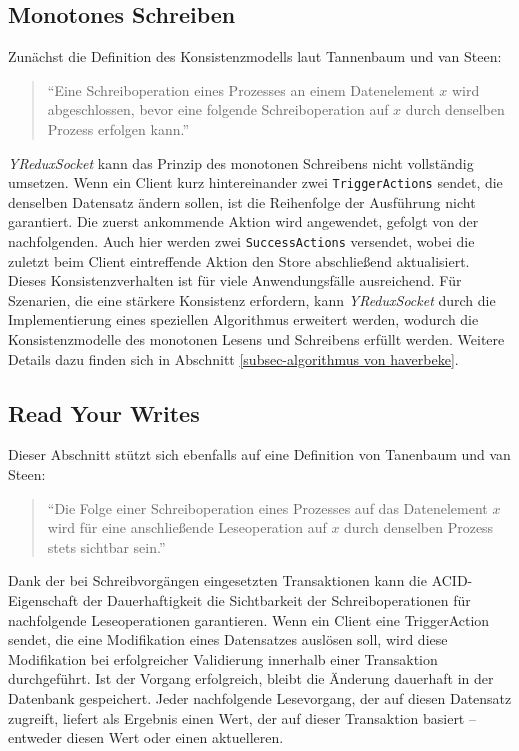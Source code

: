 \documentclass[12pt]{book}          %
\begin{document}
\subsection{Monotones Schreiben}
\label{subsec-monotones-schreiben}

Zunächst die Definition des Konsistenzmodells laut Tannenbaum und van Steen:

\begin{quote}
"`Eine Schreiboperation eines Prozesses an einem Datenelement $x$ wird abgeschlossen, bevor eine folgende Schreiboperation auf $x$ durch denselben Prozess erfolgen kann."' \cite[323]{tanenbaum_verteilte_2008}
\end{quote}

\textit{YReduxSocket} kann das Prinzip des monotonen Schreibens nicht vollständig umsetzen. Wenn ein Client kurz hintereinander zwei \texttt{TriggerActions} sendet, die denselben Datensatz ändern sollen, ist die Reihenfolge der Ausführung nicht garantiert. Die zuerst ankommende Aktion wird angewendet, gefolgt von der nachfolgenden. Auch hier werden zwei \texttt{SuccessActions} versendet, wobei die zuletzt beim Client eintreffende Aktion den Store abschließend aktualisiert. Dieses Konsistenzverhalten ist für viele Anwendungsfälle ausreichend. Für Szenarien, die eine stärkere Konsistenz erfordern, kann \textit{YReduxSocket} durch die Implementierung eines speziellen Algorithmus erweitert werden, wodurch die Konsistenzmodelle des monotonen Lesens und Schreibens erfüllt werden. Weitere Details dazu finden sich in Abschnitt \ref{subsec-algorithmus von haverbeke}.

\subsection{Read Your Writes}
\label{subsec-read-your-writes}

Dieser Abschnitt stützt sich ebenfalls auf eine Definition von Tanenbaum und van Steen:

\begin{quote}
"`Die Folge einer Schreiboperation eines Prozesses auf das Datenelement $x$ wird für eine anschließende Leseoperation auf $x$ durch denselben Prozess stets sichtbar sein."' \cite[324]{tanenbaum_verteilte_2008}
\end{quote}

Dank der bei Schreibvorgängen eingesetzten Transaktionen kann die ACID-Eigenschaft der Dauerhaftigkeit die Sichtbarkeit der Schreiboperationen für nachfolgende Leseoperationen garantieren. Wenn ein Client eine TriggerAction sendet, die eine Modifikation eines Datensatzes auslösen soll, wird diese Modifikation bei erfolgreicher Validierung innerhalb einer Transaktion durchgeführt. Ist der Vorgang erfolgreich, bleibt die Änderung dauerhaft in der Datenbank gespeichert. Jeder nachfolgende Lesevorgang, der auf diesen Datensatz zugreift, liefert als Ergebnis einen Wert, der auf dieser Transaktion basiert – entweder diesen Wert oder einen aktuelleren.
\end{document}
